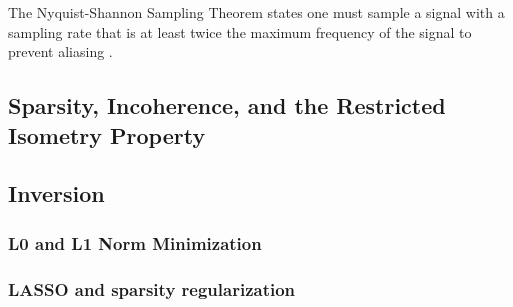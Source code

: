 The Nyquist-Shannon Sampling Theorem states one must sample a signal with a sampling rate that is at least twice the maximum frequency of the signal to prevent aliasing \cite{shannon1949communication}.


\subsection{Sparsity, Incoherence, and the Restricted Isometry Property}

\subsection{Inversion}

\subsubsection{L0 and L1 Norm Minimization}

\subsubsection{LASSO and sparsity regularization}

%  
%



